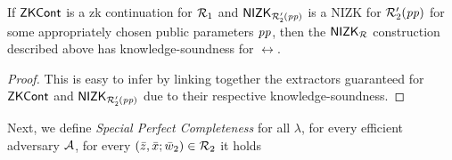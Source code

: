 \begin{lemma} 
\label{le:KS_for_nizkR}
If ${\mathsf{ZKCont}}$ is a zk continuation for $\mathcal{R}_1$ and ${\mathsf{NIZK_{\mathcal{R}'_2(\mathit{pp})}}}$ is a NIZK for $\mathcal{R}_2'(\mathit{pp})$ for some appropriately chosen public parameters $\mathit{pp}$, 
then the ${\mathsf{NIZK_{\mathcal{R}}}}$ construction described above has knowledge-soundness for $\rel$. 
\end{lemma} 
\begin{proof}This is easy to infer by linking together the extractors guaranteed for ${\mathsf{ZKCont}}$ and ${\mathsf{NIZK_{\mathcal{R}'_2(\mathit{pp})}}}$ due to their respective 
knowledge-soundness.
\end{proof}
 \noindent Next, we define 
 \emph{Special Perfect Completeness} for all $\lambda $, for every efficient adversary $\mathcal{A}$, for every 
 $(\bar{z}, \bar{x}; \bar{w}_2) \in \mathcal{R}_2$ it holds
